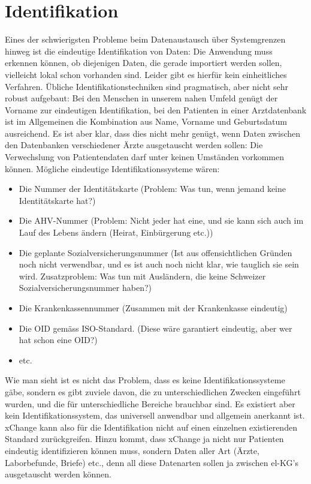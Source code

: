 \documentclass[a4paper]{scrartcl}
\begin{document}
\section{Identifikation}
 Eines der schwierigsten Probleme beim Datenaustausch über Systemgrenzen hinweg ist die eindeutige Identifikation von Daten: Die Anwendung muss erkennen können, ob diejenigen Daten, die gerade importiert werden sollen, vielleicht lokal schon vorhanden sind. Leider gibt es hierfür kein einheitliches Verfahren. Übliche Identifikationstechniken sind pragmatisch, aber nicht sehr robust aufgebaut: Bei den Menschen in unserem nahen Umfeld genügt der Vorname zur eindeutigen Identifikation, bei den Patienten in einer Arztdatenbank ist im Allgemeinen die Kombination aus Name, Vorname und Geburtsdatum ausreichend. Es ist aber klar, dass dies nicht mehr genügt, wenn Daten zwischen den Datenbanken verschiedener Ärzte ausgetauscht werden sollen: Die Verwechslung von Patientendaten darf unter keinen Umständen vorkommen können. Mögliche eindeutige Identifikationssysteme wären:
 \begin{itemize}
 \item Die Nummer der Identitätskarte (Problem: Was tun, wenn jemand keine Identitätskarte hat?)
 \item Die AHV-Nummer (Problem: Nicht jeder hat eine, und sie kann sich auch im Lauf des Lebens ändern (Heirat, Einbürgerung etc.))
 \item Die geplante Sozialversicherungsnummer (Ist aus offensichtlichen Gründen noch nicht verwendbar, und es ist auch noch nicht klar, wie tauglich sie sein wird. Zusatzproblem: Was tun mit Ausländern, die keine Schweizer Sozialversicherungsnummer haben?)
 \item Die Krankenkassennummer (Zusammen mit der Krankenkasse eindeutig)
 \item Die OID gemäss ISO-Standard. (Diese wäre garantiert eindeutig, aber wer hat schon eine OID?)
 \item etc.
  \end{itemize}

 Wie man sieht ist es nicht das Problem, dass es keine Identifikationssysteme gäbe, sondern es gibt zuviele davon, die zu unterschiedlichen Zwecken eingeführt wurden, und die für unterschiedliche Bereiche brauchbar sind. Es existiert aber kein Identifikationssystem, das universell anwendbar und allgemein anerkannt ist. xChange kann also für die Identifikation nicht auf einen einzelnen existierenden Standard zurückgreifen. Hinzu kommt, dass xChange ja nicht nur Patienten eindeutig identifizieren können muss, sondern Daten aller Art (Ärzte, Laborbefunde, Briefe) etc., denn all diese Datenarten sollen ja zwischen el-KG's ausgetauscht werden können.
\end{document}
